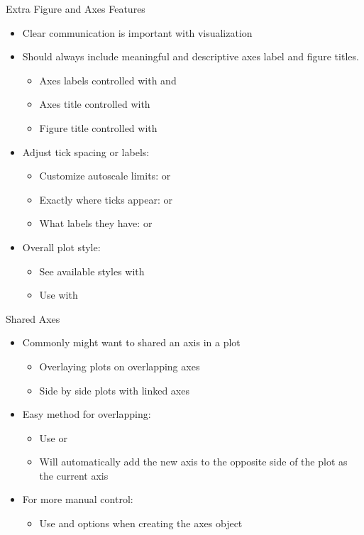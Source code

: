 \documentclass[pdf, aspectratio=169, 12pt]{beamer}
\begin{document}
\begin{frame}{Extra Figure and Axes Features}
	\begin{itemize}
		\item Clear communication is important with visualization
		\item<+-> Should always include meaningful and descriptive axes label and figure titles.%
			\begin{itemize}
				\item Axes labels controlled with  and 
				\item Axes title controlled with 
				\item Figure title controlled with 
			\end{itemize}
		\item<+-> Adjust tick spacing or labels:
			\begin{itemize}
				\item Customize autoscale limits:  or 
				\item Exactly where ticks appear:  or 
				\item What labels they have:  or 
			\end{itemize}
		\item<+-> Overall plot style:
			\begin{itemize}
				\item See available styles with 
				\item Use with 
			\end{itemize}
	\end{itemize}
\end{frame}

\begin{frame}{Shared Axes}
	\begin{itemize}
		\item Commonly might want to shared an axis in a plot
			\begin{itemize}
				\item Overlaying plots on overlapping axes
				\item Side by side plots with linked axes
			\end{itemize}
		\item Easy method for overlapping:
			\begin{itemize}
				\item Use  or 
				\item Will automatically add the new axis to the opposite side of the plot as the current axis
			\end{itemize}
		\item For more manual control:
			\begin{itemize}
				\item Use  and  options when creating the axes object
			\end{itemize}
	\end{itemize}
\end{frame}
\end{document}
